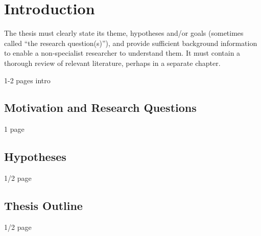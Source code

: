 \chapter{Introduction}
\label{introduction}

The thesis must clearly state its theme, hypotheses and/or goals (sometimes called “the research question(s)”), and provide sufficient background information to enable a non-specialist researcher to understand them. It must contain a thorough review of relevant literature, perhaps in a separate chapter.

1-2 pages intro

\section{Motivation and Research Questions}
1 page

\section{Hypotheses}

1/2 page

\section{Thesis Outline}

1/2 page 